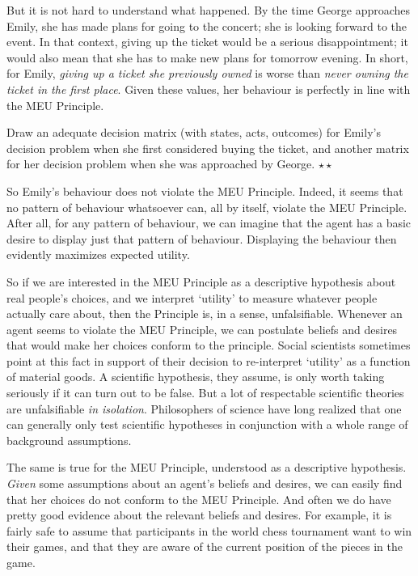 But it is not hard to understand what happened. By the time George
approaches Emily, she has made plans for going to the concert; she is
looking forward to the event. In that context, giving up the ticket
would be a serious disappointment; it would also mean that she has to
make new plans for tomorrow evening. In short, for Emily, \emph{giving
  up a ticket she previously owned} is worse than \emph{never owning
  the ticket in the first place}. Given these values, her behaviour is
perfectly in line with the MEU Principle.

\begin{exercise}
  Draw an adequate decision matrix (with states, acts, outcomes) for
  Emily's decision problem when she first considered buying the
  ticket, and another matrix for her decision problem when she was
  approached by George. $\star\star$
  

\end{exercise}

So Emily's behaviour does not violate the MEU Principle. Indeed, it
seems that no pattern of behaviour whatsoever can, all by itself,
violate the MEU Principle. After all, for any pattern of behaviour, we
can imagine that the agent has a basic desire to display just that
pattern of behaviour. Displaying the behaviour then evidently
maximizes expected utility.

So if we are interested in the MEU Principle as a descriptive
hypothesis about real people's choices, and we interpret `utility' to
measure whatever people actually care about, then the Principle is, in
a sense, unfalsifiable. Whenever an agent seems to violate the MEU
Principle, we can postulate beliefs and desires that would make her
choices conform to the principle. Social scientists sometimes point at
this fact in support of their decision to re-interpret `utility' as a
function of material goods. A scientific hypothesis, they assume, is
only worth taking seriously if it can turn out to be false. But a lot
of respectable scientific theories are unfalsifiable \emph{in
  isolation}. Philosophers of science have long realized that one can
generally only test scientific hypotheses in conjunction with a whole
range of background assumptions.

The same is true for the MEU Principle, understood as a descriptive
hypothesis. \emph{Given} some assumptions about an agent's beliefs and
desires, we can easily find that her choices do not conform to the MEU
Principle. And often we do have pretty good evidence about the
relevant beliefs and desires. For example, it is fairly safe to assume
that participants in the world chess tournament want to win their
games, and that they are aware of the current position of the pieces
in the game.

